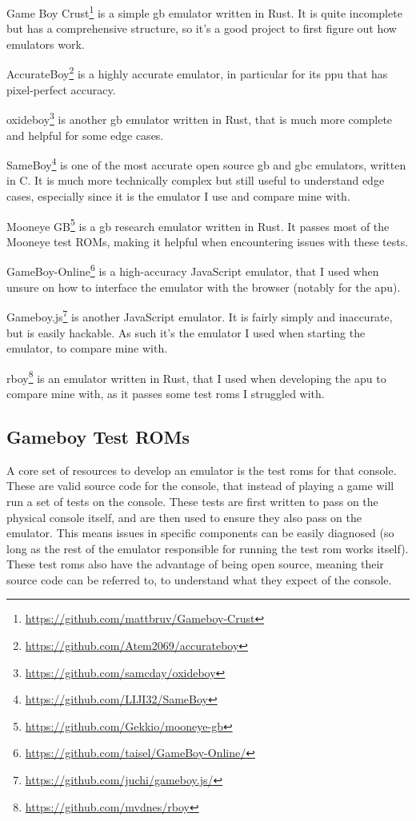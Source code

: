 \documentclass[11pt]{report}
\newcommand{\ftnt}[1]{\footnote{\url{#1}}}
\begin{document}
\begin{compactitem}
    \item Game Boy Crust\ftnt{https://github.com/mattbruv/Gameboy-Crust} is a simple \gls{gb} emulator written in Rust. It is quite incomplete but has a comprehensive structure, so it's a good project to first figure out how emulators work.
    \item AccurateBoy\ftnt{https://github.com/Atem2069/accurateboy} is a highly accurate emulator, in particular for its \gls{ppu} that has pixel-perfect accuracy.
    \item oxideboy\ftnt{https://github.com/samcday/oxideboy} is another \gls{gb} emulator written in Rust, that is much more complete and helpful for some edge cases.
    \item SameBoy\ftnt{https://github.com/LIJI32/SameBoy} is one of the most accurate open source \gls{gb} and \gls{gbc} emulators, written in C. It is much more technically complex but still useful to understand edge cases, especially since it is the emulator I use and compare mine with.
    \item Mooneye GB\ftnt{https://github.com/Gekkio/mooneye-gb} is a \gls{gb} research emulator written in Rust. It passes most of the Mooneye test ROMs, making it helpful when encountering issues with these tests.
    \item GameBoy-Online\ftnt{https://github.com/taisel/GameBoy-Online/} is a high-accuracy JavaScript emulator, that I used when unsure on how to interface the emulator with the browser (notably for the \gls{apu}).
    \item Gameboy.js\ftnt{https://github.com/juchi/gameboy.js/} is another JavaScript emulator. It is fairly simply and inaccurate, but is easily hackable. As such it's the emulator I used when starting the emulator, to compare mine with.
    \item rboy\ftnt{https://github.com/mvdnes/rboy} is an emulator written in Rust, that I used when developing the \gls{apu} to compare mine with, as it passes some test \glspl{rom} I struggled with.
\end{compactitem}

\subsection{Gameboy Test ROMs}
\label{sec:gb-test-roms}

A core set of resources to develop an emulator is the test \glspl{rom} for that console. These are valid source code for the console, that instead of playing a game will run a set of tests on the console. These tests are first written to pass on the physical console itself, and are then used to ensure they also pass on the emulator. This means issues in specific components can be easily diagnosed (so long as the rest of the emulator responsible for running the test \gls{rom} works itself). These test \glspl{rom} also have the advantage of being open source, meaning their source code can be referred to, to understand what they expect of the console.
\end{document}
